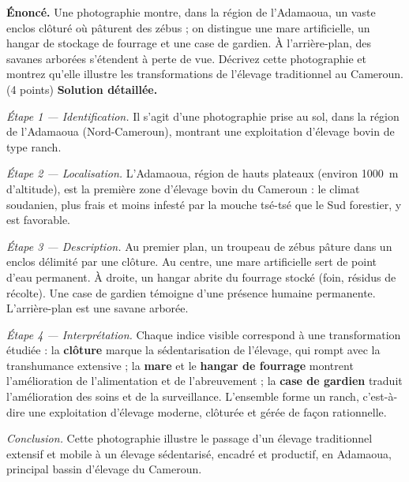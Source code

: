 \documentclass[11pt]{article}
\newcommand{\cle}[1]{{\popxbold\color{popdark}#1}}
\newcounter{popsec}
\newcounter{popsub}
\newcommand{\courssub}[1]{%
  \stepcounter{popsub}%
  \par\vspace{9pt}\noindent{\popxbold\fontsize{11.5}{13}\selectfont\color{popink}{\color{poporange}\thepopsec.\thepopsub}\hspace{6pt}#1}\par\nopagebreak\vspace{4pt}
}
\begin{document}
\begin{exoresolu}
\textbf{Énoncé.} Une photographie montre, dans la région de l'Adamaoua, un vaste enclos clôturé où pâturent des zébus ; on distingue une mare artificielle, un hangar de stockage de fourrage et une case de gardien. À l'arrière-plan, des savanes arborées s'étendent à perte de vue. Décrivez cette photographie et montrez qu'elle illustre les transformations de l'élevage traditionnel au Cameroun. (4 points)
\tcblower
\textbf{Solution détaillée.}

\emph{Étape 1 — Identification.} Il s'agit d'une photographie prise au sol, dans la région de l'Adamaoua (Nord-Cameroun), montrant une exploitation d'élevage bovin de type ranch.

\emph{Étape 2 — Localisation.} L'Adamaoua, région de hauts plateaux (environ \SI{1000}{m} d'altitude), est la première zone d'élevage bovin du Cameroun : le climat soudanien, plus frais et moins infesté par la mouche tsé-tsé que le Sud forestier, y est favorable.

\emph{Étape 3 — Description.} Au premier plan, un troupeau de zébus pâture dans un enclos délimité par une clôture. Au centre, une mare artificielle sert de point d'eau permanent. À droite, un hangar abrite du fourrage stocké (foin, résidus de récolte). Une case de gardien témoigne d'une présence humaine permanente. L'arrière-plan est une savane arborée.

\emph{Étape 4 — Interprétation.} Chaque indice visible correspond à une transformation étudiée : la \textbf{clôture} marque la sédentarisation de l'élevage, qui rompt avec la transhumance extensive ; la \textbf{mare} et le \textbf{hangar de fourrage} montrent l'amélioration de l'alimentation et de l'abreuvement ; la \textbf{case de gardien} traduit l'amélioration des soins et de la surveillance. L'ensemble forme un \cle{ranch}, c'est-à-dire une exploitation d'élevage moderne, clôturée et gérée de façon rationnelle.

\emph{Conclusion.} Cette photographie illustre le passage d'un élevage traditionnel extensif et mobile à un élevage sédentarisé, encadré et productif, en Adamaoua, principal bassin d'élevage du Cameroun.
\end{exoresolu}

\courssub{Fiche méthode 2 : Légender une carte}
\end{document}
